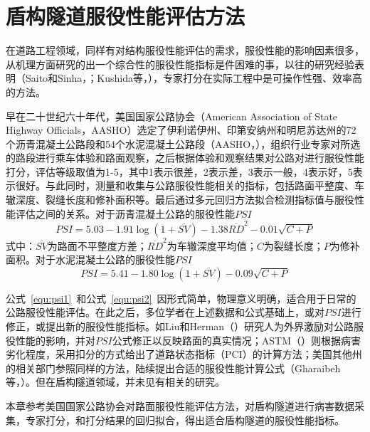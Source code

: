 \chapter{盾构隧道服役性能评估方法}
\label{chap:tsi}

在道路工程领域，同样有对结构服役性能评估的需求，服役性能的影响因素很多，从机理方面研究的出一个综合性的服役性能指标是件困难的事，以往的研究经验表明（Saito和Sinha，\citeyear{saito1991delphi}；Kushida等，\citeyear{kushida1997development}），专家打分在实际工程中是可操作性强、效率高的方法。

早在二十世纪六十年代，美国国家公路协会（American Association of State Highway Officials，AASHO）选定了伊利诺伊州、印第安纳州和明尼苏达州的72个沥青混凝土公路段和54个水泥混凝土公路段（AASHO，\citeyear{AASHO1962the}），组织行业专家对所选的路段进行乘车体验和路面观察，之后根据体验和观察结果对公路对进行服役性能打分，评估等级取值为1-5，其中1表示很差，2表示差，3表示一般，4表示好，5表示很好。与此同时，测量和收集与公路服役性能相关的指标，包括路面平整度、车辙深度、裂缝长度和修补面积等。最后通过多元回归方法拟合检测指标值与服役性能评估之间的关系。对于沥青混凝土公路的服役性能$PSI$
\begin{equation}
	\label{equ:psi1}
	PSI=5.03-1.91\log (1+\overline{SV})-1.38{{\overline{RD}}^{2}}-0.01\sqrt{C+P}
\end{equation}
式中：$\overline{SV}$为路面不平整度方差；${{\overline{RD}}^{2}}$为车辙深度平均值；$C$为裂缝长度；$P$为修补面积。对于水泥混凝土公路的服役性能$PSI$
\begin{equation}
	\label{equ:psi2}
	PSI=5.41-1.80\log (1+\overline{SV})-0.09\sqrt{C+P}
\end{equation}

公式~\ref{equ:psi1}~和公式~\ref{equ:psi2}~因形式简单，物理意义明确，适合用于日常的公路服役性能评估。在此之后，多位学者在上述数据和公式基础上，或对$PSI$进行修正，或提出新的服役性能指标。如Liu和Herman（\citeyear{liu1996new}）研究人为外界激励对公路服役性能的影响，并对$PSI$公式修正以反映路面的真实情况；ASTM（\citeyear{astm20096433}）则根据病害劣化程度，采用扣分的方式给出了道路状态指标（PCI）的计算方法；美国其他州的相关部门参照同样的方法，陆续提出合适的服役性能计算公式（Gharaibeh等，\citeyear{gharaibeh2009assessing}）。但在盾构隧道领域，并未见有相关的研究。

本章参考美国国家公路协会对路面服役性能评估方法，对盾构隧道进行病害数据采集，专家打分，和打分结果的回归拟合，得出适合盾构隧道的服役性能指标。

